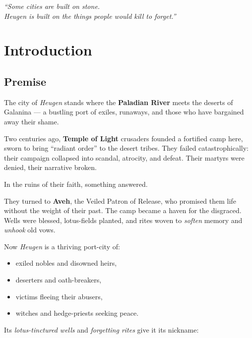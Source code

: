 \documentclass[11pt]{article}
\newcommand{\Term}[1]{\textbf{#1}}
\newcommand{\Place}[1]{\textit{#1}}
\begin{document}


\vspace{-2em}

\begin{center}
\textit{``Some cities are built on stone.\\
Heugen is built on the things people would kill to forget.''}
\end{center}

\tableofcontents
\newpage


\section{Introduction}
\label{sec:intro}

\subsection*{Premise}

The city of \Place{Heugen} stands where the \Term{Paladian River} meets the deserts of Galanina --- a bustling port of exiles, runaways, and those who have bargained away their shame.

Two centuries ago, \Term{Temple of Light} crusaders founded a fortified camp here, sworn to bring ``radiant order'' to the desert tribes. They failed catastrophically: their campaign collapsed into scandal, atrocity, and defeat. Their martyrs were denied, their narrative broken.

In the ruins of their faith, something answered.

They turned to \Term{Aveh}, the Veiled Patron of Release, who promised them life without the weight of their past. The camp became a haven for the disgraced. Wells were blessed, lotus-fields planted, and rites woven to \emph{soften} memory and \emph{unhook} old vows.

Now \Place{Heugen} is a thriving port-city of:
\begin{itemize}[leftmargin=*]
  \item exiled nobles and disowned heirs,
  \item deserters and oath-breakers,
  \item victims fleeing their abusers,
  \item witches and hedge-priests seeking peace.
\end{itemize}

Its \emph{lotus-tinctured wells} and \emph{forgetting rites} give it its nickname:
\end{document}
